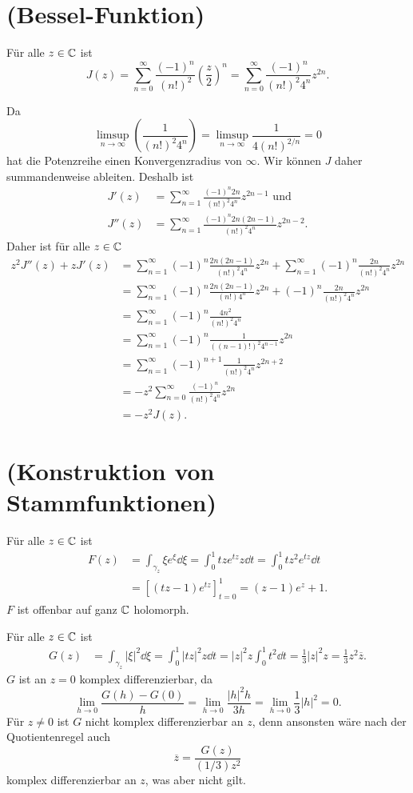 \documentclass[a4paper,10pt]{article}
\begin{document}
\section{(Bessel-Funktion)}
Für alle $z \in \mathbb{C}$ ist
\[
 J(z)
 = \sum_{n=0}^\infty \frac{(-1)^n}{(n!)^2} \left( \frac{z}{2} \right)^n
 = \sum_{n=0}^\infty \frac{(-1)^n}{(n!)^2 4^n} z^{2n}.
\]

Da
\[
 \limsup_{n \to \infty} \left( \frac{1}{(n!)^2 4^n} \right) = \limsup_{n \to \infty} \frac{1}{4 (n!)^{2/n}} = 0
\]
hat die Potenzreihe einen Konvergenzradius von $\infty$. Wir können $J$ daher summandenweise ableiten. Deshalb ist
\begin{align*}
  J'(z) &= \sum_{n=1}^\infty \frac{(-1)^n 2n}{(n!)^2 4^n}{z^{2n-1}} \text{ und} \\
 J''(z) &= \sum_{n=1}^\infty \frac{(-1)^n 2n (2n-1)}{(n!)^2 4^n} z^{2n-2}.
\end{align*}
Daher ist für alle $z \in \mathbb{C}$
\begin{align*}
 z^2 J''(z) + z J'(z)
 &= \sum_{n=1}^\infty (-1)^n \frac{2n(2n-1)}{(n!)^2 4^n} z^{2n} + \sum_{n=1}^\infty (-1)^n \frac{2n}{(n!)^2 4^n} z^{2n} \\
 &= \sum_{n=1}^\infty (-1)^n \frac{2n(2n-1)}{(n!)4^n} z^{2n} + (-1)^n \frac{2n}{(n!)^2 4^n} z^{2n} \\
 &= \sum_{n=1}^\infty (-1)^n \frac{4n^2}{(n!)^2 4^n} \\
 &= \sum_{n=1}^\infty (-1)^n \frac{1}{((n-1)!)^2 4^{n-1}} z^{2n} \\
 &= \sum_{n=1}^\infty (-1)^{n+1} \frac{1}{(n!)^2 4^n} z^{2n+2} \\
 &= -z^2 \sum_{n=0}^\infty \frac{(-1)^n}{(n!)^2 4^n} z^{2n} \\
 &= -z^2 J(z).
\end{align*}





\section{(Konstruktion von Stammfunktionen)}
Für alle $z \in \mathbb{C}$ ist
\begin{align*}
 F(z)
 &= \int_{\gamma_z} \xi e^{\xi} \dd{\xi}
 = \int_0^1 tz e^{tz} z \dd{t}
 = \int_0^1 t z^2 e^{tz} \dd{t} \\
 &= \left[ (tz-1) e^{tz} \right]_{t=0}^1
 = (z-1)e^z + 1.
\end{align*}
$F$ ist offenbar auf ganz $\mathbb{C}$ holomorph.

Für alle $z \in \mathbb{C}$ ist
\begin{align*}
 G(z)
 &= \int_{\gamma_z} |\xi|^2 \dd{\xi}
 = \int_0^1 |tz|^2 z \dd{t}
 = |z|^2 z \int_0^1 t^2 \dd{t}
 = \frac{1}{3} |z|^2 z
 = \frac{1}{3} z^2 \overline{z}.
\end{align*}
$G$ ist an $z = 0$ komplex differenzierbar, da
\[
 \lim_{h \to 0} \frac{G(h)-G(0)}{h}
 = \lim_{h \to 0} \frac{|h|^2 h}{3h}
 = \lim_{h \to 0} \frac{1}{3} |h|^2
 = 0.
\]
Für $z \neq 0$ ist $G$ nicht komplex differenzierbar an $z$, denn ansonsten wäre nach der Quotientenregel auch
\[
 \overline{z} = \frac{G(z)}{(1/3)z^2}
\]
komplex differenzierbar an $z$, was aber nicht gilt.
\end{document}
